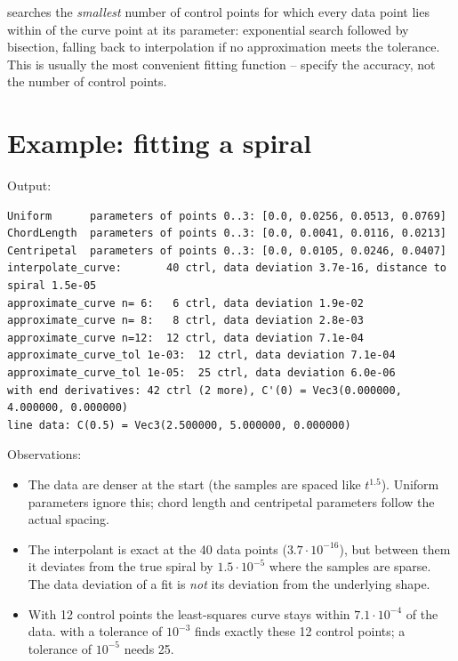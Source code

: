  searches the \emph{smallest} number of control points for which
every data point lies within  of the curve point at its parameter: exponential
search followed by bisection, falling back to interpolation if no approximation meets the
tolerance. This is usually the most convenient fitting function -- specify the accuracy, not the
number of control points.

\section{Example: fitting a spiral}


Output:

\begin{lstlisting}[style=text]
Uniform      parameters of points 0..3: [0.0, 0.0256, 0.0513, 0.0769]
ChordLength  parameters of points 0..3: [0.0, 0.0041, 0.0116, 0.0213]
Centripetal  parameters of points 0..3: [0.0, 0.0105, 0.0246, 0.0407]
interpolate_curve:       40 ctrl, data deviation 3.7e-16, distance to spiral 1.5e-05
approximate_curve n= 6:   6 ctrl, data deviation 1.9e-02
approximate_curve n= 8:   8 ctrl, data deviation 2.8e-03
approximate_curve n=12:  12 ctrl, data deviation 7.1e-04
approximate_curve_tol 1e-03:  12 ctrl, data deviation 7.1e-04
approximate_curve_tol 1e-05:  25 ctrl, data deviation 6.0e-06
with end derivatives: 42 ctrl (2 more), C'(0) = Vec3(0.000000, 4.000000, 0.000000)
line data: C(0.5) = Vec3(2.500000, 5.000000, 0.000000)
\end{lstlisting}

Observations:

\begin{itemize}
\item The data are denser at the start (the samples are spaced like $t^{1.5}$). Uniform
  parameters ignore this; chord length and centripetal parameters follow the actual spacing.
\item The interpolant is exact at the 40 data points ($3.7\cdot10^{-16}$), but between them it
  deviates from the true spiral by $1.5\cdot10^{-5}$ where the samples are sparse. The data
  deviation of a fit is \emph{not} its deviation from the underlying shape.
\item With 12 control points the least-squares curve stays within $7.1\cdot10^{-4}$ of the data.
   with a tolerance of $10^{-3}$ finds exactly these 12 control
  points; a tolerance of $10^{-5}$ needs 25.
\end{itemize}

